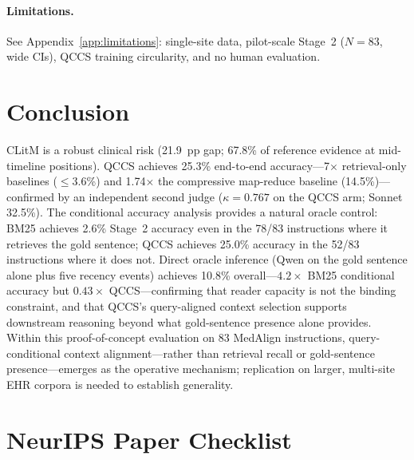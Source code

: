\documentclass{article}
\begin{document}
\paragraph{Limitations.}
See Appendix~\ref{app:limitations}: single-site data, pilot-scale Stage~2
($N{=}83$, wide CIs), QCCS training circularity, and no human evaluation.

\section{Conclusion}
\label{sec:conclusion}

CLitM is a robust clinical risk (21.9~pp gap; 67.8\% of reference evidence at
mid-timeline positions). QCCS achieves 25.3\% end-to-end accuracy---7$\times$
retrieval-only baselines ($\leq$3.6\%) and 1.74$\times$ the compressive map-reduce
baseline (14.5\%)---confirmed by an independent second judge ($\kappa = 0.767$
on the QCCS arm; Sonnet 32.5\%). The conditional accuracy
analysis provides a natural oracle control: BM25 achieves 2.6\% Stage~2 accuracy
even in the 78/83 instructions where it retrieves the gold sentence; QCCS achieves
25.0\% accuracy in the 52/83 instructions where it does not.
Direct oracle inference (Qwen on the gold sentence alone plus five recency events)
achieves 10.8\% overall---$4.2\times$ BM25 conditional accuracy but $0.43\times$
QCCS---confirming that reader capacity is not the binding constraint, and that
QCCS's query-aligned context selection supports downstream reasoning beyond what
gold-sentence presence alone provides.
Within this proof-of-concept evaluation on 83 MedAlign instructions,
query-conditional context alignment---rather than retrieval recall or
gold-sentence presence---emerges as the operative mechanism; replication
on larger, multi-site EHR corpora is needed to establish generality.




\newpage
\section*{NeurIPS Paper Checklist}
\end{document}
